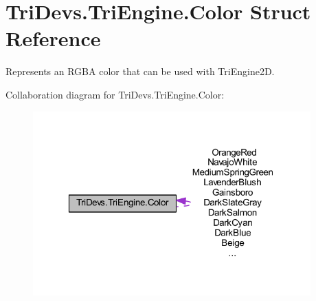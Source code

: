 \hypertarget{struct_tri_devs_1_1_tri_engine_1_1_color}{\section{Tri\-Devs.\-Tri\-Engine.\-Color Struct Reference}
\label{struct_tri_devs_1_1_tri_engine_1_1_color}
}


Represents an R\-G\-B\-A color that can be used with Tri\-Engine2\-D.  




Collaboration diagram for Tri\-Devs.\-Tri\-Engine.\-Color\-:
\nopagebreak
\begin{figure}[H]
\begin{center}
\leavevmode
\includegraphics[width=303pt]{struct_tri_devs_1_1_tri_engine_1_1_color__coll__graph}
\end{center}
\end{figure}
